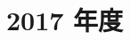 \documentclass[../../hsm_tok_a.tex]{subfiles}
\begin{document}
    \section{2017 年度}

    

    \clearpage

    
\end{document}
